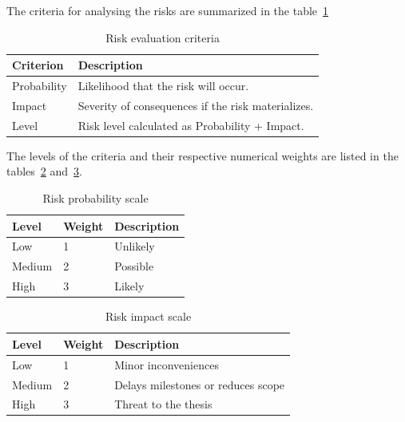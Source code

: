 The criteria for analysing the risks are summarized in the table~\ref{tab:risk-criteria}

\begin{table}[h]
    \begin{tabularx}{\textwidth}{lX}
        \toprule
        \textbf{Criterion} & \textbf{Description} \\
        \midrule
        Probability & Likelihood that the risk will occur. \\
        Impact & Severity of consequences if the risk materializes. \\
        Level & Risk level calculated as Probability + Impact. \\
        \bottomrule
    \end{tabularx}
    \caption{Risk evaluation criteria}\label{tab:risk-criteria}
\end{table}

The levels of the criteria and their respective numerical weights are listed in the tables~\ref{tab:risk-probability-scale} and~\ref{tab:risk-impact-scale}.

\begin{table}[h]
    \begin{tabularx}{\textwidth}{llX}
        \toprule
        \textbf{Level} & \textbf{Weight} & \textbf{Description} \\
        \midrule
        Low & 1 & Unlikely \\
        Medium & 2 & Possible \\
        High & 3 & Likely \\
        \bottomrule
    \end{tabularx}
    \caption{Risk probability scale}\label{tab:risk-probability-scale}
\end{table}

\begin{table}[h]
    \begin{tabularx}{\textwidth}{llX}
        \toprule
        \textbf{Level} & \textbf{Weight} & \textbf{Description} \\
        \midrule
        Low & 1 & Minor inconveniences \\
        Medium & 2 & Delays milestones or reduces scope \\
        High & 3 & Threat to the thesis \\
        \bottomrule
    \end{tabularx}
    \caption{Risk impact scale}\label{tab:risk-impact-scale}
\end{table}

